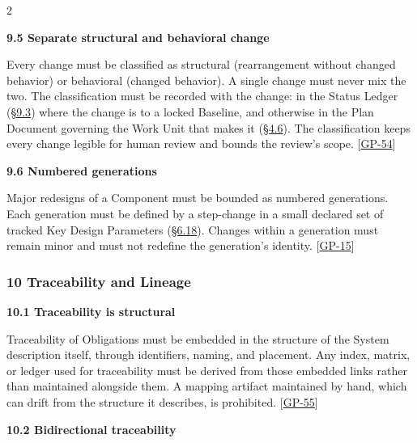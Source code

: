 \begin{multicols}{2}
\par\smallskip\noindent\textbf{9.5 Separate structural and behavioral change}\par\nopagebreak

Every change must be classified as structural (rearrangement without changed behavior) or behavioral (changed behavior). A single change must never mix the two. The classification must be recorded with the change: in the Status Ledger (\hyperlink{nss-9.3}{\S9.3}) where the change is to a locked Baseline, and otherwise in the Plan Document governing the Work Unit that makes it (\hyperlink{nss-4.6}{\S4.6}). The classification keeps every change legible for human review and bounds the review's scope. [\hyperlink{gp-54}{GP-54}]

\hypertarget{nss-9.6}{}

\par\smallskip\noindent\textbf{9.6 Numbered generations}\par\nopagebreak

Major redesigns of a Component must be bounded as numbered generations. Each generation must be defined by a step-change in a small declared set of tracked Key Design Parameters (\hyperlink{nss-6.18}{\S6.18}). Changes within a generation must remain minor and must not redefine the generation's identity. [\hyperlink{gp-15}{GP-15}]

\hypertarget{nss-10}{}

\subsubsection*{10 Traceability and Lineage}

\hypertarget{nss-10.1}{}

\par\smallskip\noindent\textbf{10.1 Traceability is structural}\par\nopagebreak

Traceability of Obligations must be embedded in the structure of the System description itself, through identifiers, naming, and placement. Any index, matrix, or ledger used for traceability must be derived from those embedded links rather than maintained alongside them. A mapping artifact maintained by hand, which can drift from the structure it describes, is prohibited. [\hyperlink{gp-55}{GP-55}]

\hypertarget{nss-10.2}{}

\par\smallskip\noindent\textbf{10.2 Bidirectional traceability}\par\nopagebreak


\end{multicols}
